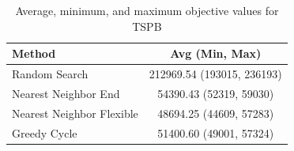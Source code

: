 \begin{table}[h!]
\centering
\begin{tabular}{lc}
\hline
Method & Avg (Min, Max) \\
\hline
Random Search & 212969.54 (193015, 236193) \\
Nearest Neighbor End & 54390.43 (52319, 59030) \\
Nearest Neighbor Flexible & 48694.25 (44609, 57283) \\
Greedy Cycle & 51400.60 (49001, 57324) \\
\hline
\end{tabular}
\caption{Average, minimum, and maximum objective values for TSPB}
\label{tab:TSPB_results}
\end{table}
